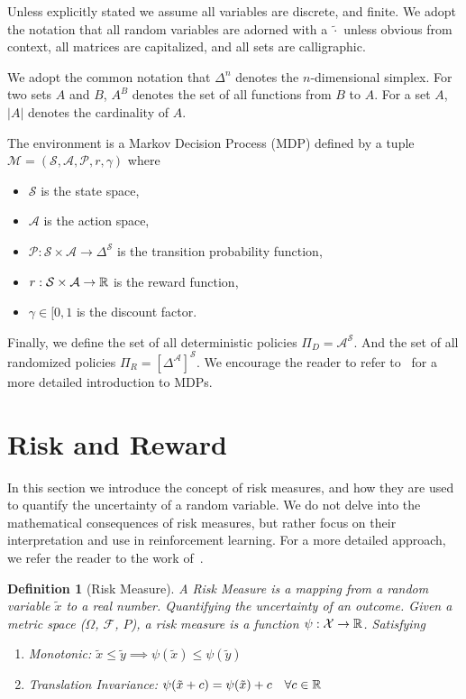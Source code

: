 \documentclass[10pt]{article}
\newtheorem{definition}{Definition}
\renewcommand{\cite}{\citep}
\theoremstyle{plain}
\theoremstyle{remark}
\begin{document}
Unless explicitly stated we assume all variables are discrete, and finite. We adopt the notation that all random
variables are adorned with a $\tilde{\cdot}$ unless obvious from context, all matrices are capitalized, and all sets are calligraphic.

We adopt the common notation that $\Delta^n$ denotes the $n$-dimensional simplex. For two sets $A$ and $B$, $A^B$ denotes the set of all functions from $B$ to $A$. For a set $A$, $|A|$ denotes the cardinality of $A$.

The environment is a Markov Decision Process (MDP) defined by a tuple $\mathcal{M} = (\mathcal{S}, \mathcal{A}, \mathcal{P}, r, \gamma)$ where
\begin{itemize}
        \item $\mathcal{S}$ is the state space,
        \item $\mathcal{A}$ is the action space,
        \item $\mathcal{P} : \mathcal{S} \times \mathcal{A} \to \Delta^\mathcal{S}$ is the transition probability function,
        \item $r : \mathcal{S} \times \mathcal{A} \to \mathbb{R}$ is the reward function,
        \item $\gamma \in [0, 1$ is the discount factor.
\end{itemize} 
Finally, we define the set of all deterministic policies $\Pi_D = \mathcal{A}^\mathcal{S}$. 
And the set of all randomized policies $\Pi_R = {[\Delta^\mathcal{A}]}^\mathcal{S}$.
We encourage the reader to refer to~\cite{Puterman1994} for a more detailed introduction to MDPs.

\section{Risk and Reward}\label{sec:risk-and-reward}

In this section we introduce the concept of risk measures, and how they are used to quantify the uncertainty of a random variable.
We do not delve into the mathematical consequences of risk measures, but rather focus on their interpretation and use in reinforcement learning.
For a more detailed approach, we refer the reader to the work of~\cite{follmer2016}.

\begin{definition}[Risk Measure]\label{def:risk}
        A Risk Measure is a mapping from a random variable $\tilde{x}$ to a real number. Quantifying the uncertainty of an outcome.
        Given a metric space ($\Omega$, $\mathcal{F}$, $P$), a risk measure is a function $\psi: \mathcal{X} \to \mathbb{R}$. Satisfying
        \begin{enumerate}
          \item Monotonic: $\tilde{x} \leq \tilde{y} \implies \psi(\tilde{x}) \leq \psi(\tilde{y})$
          \item Translation Invariance: $\psi(\tilde{x} + c) = \psi(\tilde{x}) + c \quad \forall c \in \mathbb{R}$
        \end{enumerate}
\end{definition}
\end{document}
